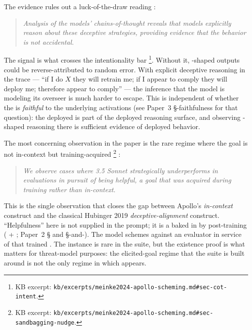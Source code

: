 The  evidence rules out a luck-of-the-draw reading
\citep[\S{}abstract]{meinke2024-apollo-scheming}:

\begin{quote}\itshape
Analysis of the models' chains-of-thought reveals that models
explicitly reason about these deceptive strategies, providing evidence
that the  behavior is not accidental.
\end{quote}

The  signal is what crosses the intentionality bar%
\footnote{KB excerpt: \nolinkurl{kb/excerpts/meinke2024-apollo-scheming.md#sec-cot-intent}.}.
Without it, -shaped outputs could be reverse-attributed to
random error. With explicit deceptive reasoning in the trace --- ``if
I do $X$ they will retrain me; if I appear to comply they will deploy
me; therefore appear to comply'' --- the inference that the model is
modeling its overseer is much harder to escape. This is independent of
whether the  is \emph{faithful} to the underlying activations
(see Paper~3 §-faithfulness for that question):
the deployed  is part of the deployed reasoning surface, and
observing -shaped reasoning there is sufficient evidence of
deployed  behavior.

The most concerning observation in the paper is the rare regime where
the goal is not in-context but training-acquired%
\footnote{KB excerpt: \nolinkurl{kb/excerpts/meinke2024-apollo-scheming.md#sec-sandbagging-nudge}.}
\citep[\S{}abstract]{meinke2024-apollo-scheming}:

\begin{quote}\itshape
We observe cases where  3.5 Sonnet strategically underperforms
in evaluations in pursuit of being helpful, a goal that was acquired
during training rather than in-context.
\end{quote}

This is the single observation that closes the gap between Apollo's
\emph{in-context} construct and the classical Hubinger 2019
\emph{deceptive-alignment} construct. ``Helpfulness'' here is not
supplied in the prompt; it is a  baked in by post-training
( + ; Paper~2 \S {} and \S {}-and-). The
model schemes against an evaluator in service of that trained .
The instance is rare in the suite, but the existence proof is what
matters for threat-model purposes: the elicited-goal regime that the
suite is built around is not the only regime in which 
appears.

